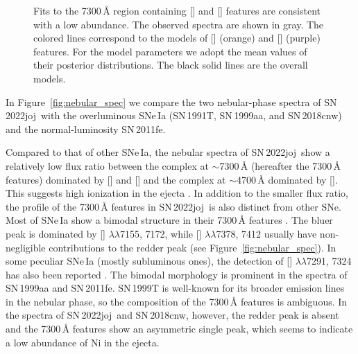 \documentclass[twocolumn]{aastex631}
\newcommand{\sn}{SN\,2022joj}
\begin{document}
\begin{CJK*}{UTF8}{gbsn}
\begin{figure}
    \caption{Fits to the 7300\,\r{A} region containing [] and [] features are consistent with a low  abundance. The observed spectra are shown in gray. The colored lines correspond to the models of [] (orange) and [] (purple) features. For the model parameters we adopt the mean values of their posterior distributions. The black solid lines are the overall models.}
    \label{fig:Fe_ni}
\end{figure}

In Figure~\ref{fig:nebular_spec} we compare the two nebular-phase spectra of \sn\ with the overluminous SNe\,Ia (SN\,1991T, SN\,1999aa, and SN\,2018cnw) and the normal-luminosity SN\,2011fe.

Compared to that of other SNe\,Ia, the nebular spectra of \sn\ show a relatively low flux ratio between the complex at $\sim$7300\,\r{A} (hereafter the 7300\,\r{A} features) dominated by [] and [] and the complex at $\sim$4700\,\r{A} dominated by []. This suggests high ionization in the ejecta \citep{Wilk_2020}. In addition to the smaller flux ratio, the profile of the 7300\,\r{A} features in \sn\ is also distinct from other SNe. Most of SNe\,Ia show a bimodal structure in their 7300\,\r{A} features \citep[e.g.,][]{Graham_2017,Maguire_2018}. The bluer peak is dominated by [] $\lambda\lambda$7155, 7172, while [] $\lambda\lambda$7378, 7412 usually have non-negligible contributions to the redder peak (see Figure~\ref{fig:nebular_spec}). In some peculiar SNe\,Ia (mostly subluminous ones), the detection of [] $\lambda\lambda$7291, 7324 has also been reported \citep[e.g.][]{jacobson-galan_16hnk_2020,Siebert_19yvq_2020}. The bimodal morphology is prominent in the spectra of SN\,1999aa and SN\,2011fe. SN\,1999T is well-known for its broader emission lines in the nebular phase, so the composition of the 7300\,\r{A} features is ambiguous. In the spectra of \sn\ and SN\,2018cnw, however, the redder peak is absent and the 7300\,\r{A} features show an asymmetric single peak, which seems to indicate a low abundance of Ni in the ejecta.


\end{CJK*}
\end{document}

